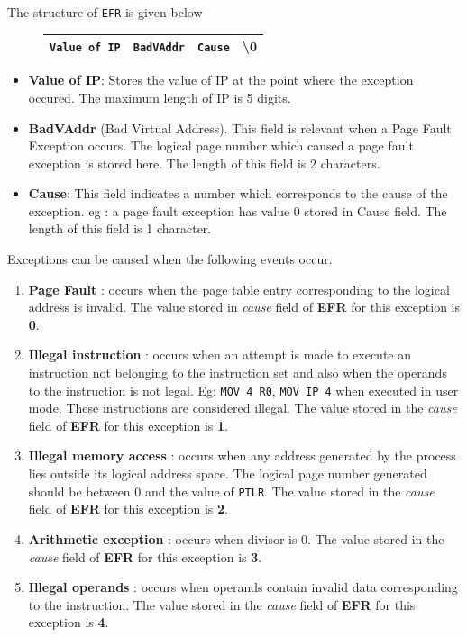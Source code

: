 \documentclass[11pt]{report}
\begin{document}
The structure of \texttt{EFR} is given below
		\begin{figure}[htp!]
		\centering
		\begin{tabular}{|c|c|c|c|}
		\hline
		\texttt{Value of IP} & \texttt{BadVAddr} & \texttt{Cause} &  \textbackslash 0 \\
		\hline
		\end{tabular}
		\end{figure}

\begin{itemize}
\item \textbf{Value of IP}: Stores the value of IP at the point where the exception occured. The maximum length of IP is 5 digits.
\item \textbf{BadVAddr} (Bad Virtual Address). This field is relevant when a Page Fault Exception occurs. The logical page number which caused a page fault exception is stored here. The length of this field is 2 characters.
\item \textbf{Cause}: This field indicates a number which corresponds to the cause of the exception. 
eg : a page fault exception has value 0 stored in Cause field. The length of this field is 1 character.
\end{itemize}

Exceptions can be caused when the following events occur.

\begin{enumerate}
\item \textbf{Page Fault} : occurs when the page table entry corresponding to the logical address is invalid. The value stored in \textit{cause} field of \textbf{EFR} for this exception is \textbf{0}.

\item \textbf{Illegal instruction} : occurs when an attempt is made to execute an instruction not belonging to the instruction set and also when the operands to the instruction is not legal. Eg: \texttt{MOV 4 R0}, \texttt{MOV IP 4} when executed in user mode. These instructions are considered illegal. The value stored in the \textit{cause} field of \textbf{EFR} for this exception is \textbf{1}.

\item \textbf{Illegal memory access} : occurs when any address generated by the process lies outside its logical address space. The logical page number generated should be between 0 and the value of \texttt{PTLR}.  The value stored in the \textit{cause} field of \textbf{EFR} for this exception is \textbf{2}.

\item \textbf{Arithmetic exception} : occurs when divisor is 0. The value stored in the \textit{cause} field of \textbf{EFR} for this exception is \textbf{3}.

\item \textbf{Illegal operands} : occurs when operands contain invalid data corresponding to the instruction. The value stored in the \textit{cause} field of \textbf{EFR} for this exception is \textbf{4}.


\end{enumerate}
\end{document}

